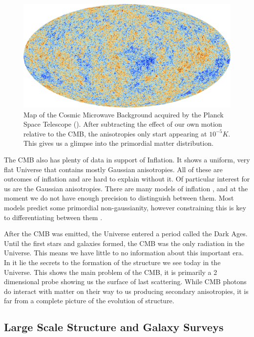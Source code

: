 \begin{figure}
    \centering
    \includegraphics[width=0.9\columnwidth]{images/misc/Planck_CMB.jpg}%
    

    \caption{
    Map of the Cosmic Microwave Background acquired by the Planck Space Telescope (\cite{2016A&A...594A..13P}). After subtracting the effect of our own motion relative to the CMB, the anisotropies only start appearing at $10^{-5} K$. This gives us a glimpse into the primordial matter distribution.
    }
    
    \label{fig:1.1}
\end{figure}

The CMB also has plenty of data in support of Inflation. It shows a uniform, very flat Universe that contains mostly Gaussian anisotropies. All of these are outcomes of inflation and are hard to explain without it. Of particular interest for us are the Gaussian anisotropies. There are many models of inflation , and at the moment we do not have enough precision to distinguish between them. Most models predict some primordial non-gaussianity, however constraining this is key to differentiating between them .

After the CMB was emitted, the Universe entered a period called the Dark Ages. Until the first stars and galaxies formed, the CMB was the only radiation in the Universe. This means we have little to no information about this important era. In it lie the secrets to the formation of the structure we see today in the Universe. This shows the main problem of the CMB, it is primarily a 2 dimensional probe showing us the surface of last scattering. While CMB photons do interact with matter on their way to us producing secondary anisotropies, it is far from a complete picture of the evolution of structure.

\subsection{Large Scale Structure and Galaxy Surveys}

